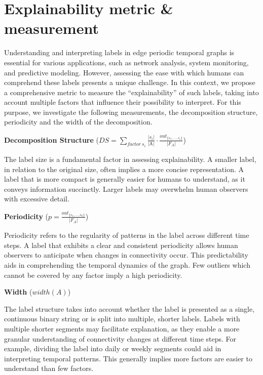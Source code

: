 \chapter{Explainability metric \& measurement}

Understanding and interpreting labels in edge periodic temporal graphs is essential for various applications, such as network analysis, system monitoring, and predictive modeling. However, assessing the ease with which humans can comprehend these labels presents a unique challenge. In this context, we propose a comprehensive metric to measure the \enquote{explainability} of such labels, taking into account multiple factors that influence their possibility to interpret. For this purpose, we investigate the following measurements, the decomposition structure, periodicity and the width of the decomposition.

\textbf{Decomposition Structure} ($DS = \sum\limits_{factor~ s_i}\frac{|s_i|}{\text{|A|}} \cdot \frac{out_{\{s_1,\dots,s_i\}}}{|F_A|}$)

The label size is a fundamental factor in assessing explainability. A smaller label, in relation to the original size, often implies a more concise representation. A label that is more compact is generally easier for humans to understand, as it conveys information succinctly. Larger labels may overwhelm human observers with excessive detail.

\textbf{Periodicity} ($p = \frac{out_{\{s_1,\dots,s_k\}}}{|F_A|}$)

Periodicity refers to the regularity of patterns in the label across different time steps. A label that exhibits a clear and consistent periodicity allows human observers to anticipate when changes in connectivity occur. This predictability aids in comprehending the temporal dynamics of the graph. Few outliers which cannot be covered by any factor imply a high periodicity.

\textbf{Width} ($width(A)$)

The label structure takes into account whether the label is presented as a single, continuous binary string or is split into multiple, shorter labels. Labels with multiple shorter segments may facilitate explanation, as they enable a more granular understanding of connectivity changes at different time steps. For example, dividing the label into daily or weekly segments could aid in interpreting temporal patterns. This generally implies more factors are easier to understand than few factors.


